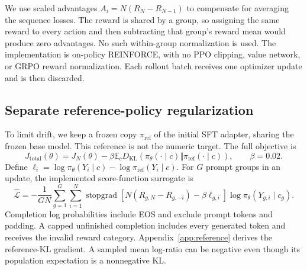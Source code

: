\documentclass[11pt,letterpaper]{article}
\newcommand{\E}{\mathbb{E}}
\newcommand{\KL}{D_{\mathrm{KL}}}
\newcommand{\sg}{\operatorname{stopgrad}}
\begin{document}
We use scaled advantages $A_i=N(R_N-R_{N-1})$ to compensate for averaging the
sequence losses. The reward is shared by a group, so assigning the same
reward to every action and then subtracting that group's reward mean would
produce zero advantages. No such within-group normalization is used.
The implementation is on-policy REINFORCE, with no PPO clipping, value
network, or GRPO reward normalization. Each rollout batch receives one
optimizer update and is then discarded.

\subsection{Separate reference-policy regularization}
To limit drift, we keep a frozen copy $\pi_{\mathrm{ref}}$ of the initial SFT
adapter, sharing the frozen base model. This reference is not the numeric
target. The full objective is
\begin{equation}
 J_{\mathrm{total}}(\theta)=J_N(\theta)
 -\beta\E_c\KL\!\left(\pi_\theta(\cdot\mid c)
                  \Vert\pi_{\mathrm{ref}}(\cdot\mid c)\right),
 \qquad \beta=0.02.
 \label{eq:fullobjective}
\end{equation}
Define $\ell_i=\log\pi_\theta(Y_i\mid c)-\log\pi_{\mathrm{ref}}(Y_i\mid c)$.
For $G$ prompt groups in an update, the implemented score-function surrogate is
\begin{equation}
 \widehat{\mathcal L}=
 -\frac{1}{GN}\sum_{g=1}^{G}\sum_{i=1}^{N}
 \sg\!\left[N(R_{g,N}-R_{g,-i})-\beta\ell_{g,i}\right]
 \log\pi_\theta(Y_{g,i}\mid c_g).
 \label{eq:surrogate}
\end{equation}
Completion log probabilities include EOS and exclude prompt tokens and
padding. A capped unfinished completion includes every generated token and
receives the invalid reward category. Appendix~\ref{app:reference} derives the
reference-KL gradient. A sampled mean log-ratio can be negative even though
its population expectation is a nonnegative KL.
\end{document}
